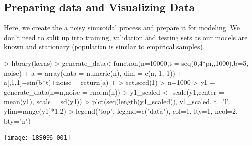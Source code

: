 \documentclass{article}
\begin{document}
\subsection{Preparing data and Visualizing Data}
Here, we create the a noisy sinusoidal process and prepare it for modeling.  We don't need to split up into training, validation and testing sets as our models are known and stationary (population is similar to empirical samples).
\begin{Schunk}
\begin{Sinput}
> library(keras)
> generate_data<-function(n=10000,t = seq(0,4*pi,,1000),b=5, noise) {
+     a = array(data = numeric(n), dim = c(n, 1, 1))
+     a[,1,1]=sin(b*t)+noise
+     return(a)
+ }
> set.seed(1)
> n=1000
> y1 = generate_data(n=n,noise = rnorm(n))
> y1_scaled <- scale(y1,center = mean(y1), scale = sd(y1))
> plot(seq(length(y1_scaled)), y1_scaled, t="l", ylim=range(y1)*1.2)
> legend("top", legend=c("data"), col=1, lty=1, ncol=2, bty="n")
\end{Sinput}
\end{Schunk}
\texttt{[image: 18S096-001]}
\end{document}
